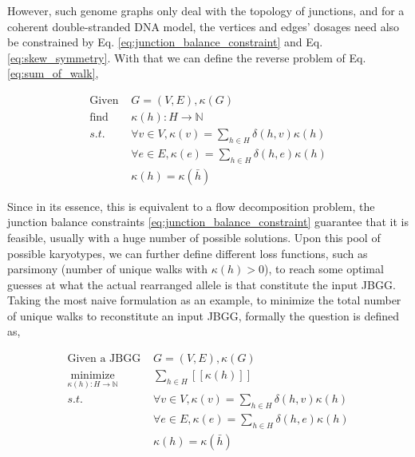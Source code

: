 \documentclass[phd,tocprelim]{cornell}
\begin{document}
However, such genome graphs only deal with the topology of junctions, and for a coherent double-stranded DNA model, the vertices and edges' dosages need also be constrained by Eq. \ref{eq:junction_balance_constraint} and Eq. \ref{eq:skew_symmetry}. With that we can define the reverse problem of Eq. \ref{eq:sum_of_walk},



\begin{equation} \label{eq:walk_decomposition}
    \begin{aligned}
        \text{Given } & G = (V, E), \kappa(G) \\
        \text{find } & \kappa(h):H \rightarrow \mathbb{N} \\
        s.t. & \forall v \in V, \kappa(v) = \sum_{h \in H}\delta(h,v)\kappa(h) \\
        & \forall e \in E, \kappa(e) = \sum_{h \in H}\delta(h,e)\kappa(h) \\
        & \kappa(h) = \kappa(\bar{h})
    \end{aligned}
\end{equation}

Since in its essence, this is equivalent to a flow decomposition problem, the junction balance constraints \ref{eq:junction_balance_constraint} guarantee that it is feasible, usually with a huge number of possible solutions. Upon this pool of possible karyotypes, we can further define different loss functions, such as parsimony (number of unique walks with $\kappa(h)>0$), to reach some optimal guesses at what the actual rearranged allele is that constitute the input JBGG. Taking the most naive formulation as an example, to minimize the total number of unique walks to reconstitute an input JBGG, formally the question is defined as,

\begin{equation} \label{eq:walk_decomposition_parsimony}
    \begin{aligned}
        \text{Given a JBGG } & G = (V, E), \kappa(G) \\
        \underset{\kappa(h):H \rightarrow \mathbb{N}}{\text{minimize}} & \sum_{h \in H} [\![ \kappa(h) ]\!] \\
        s.t. & \forall v \in V, \kappa(v) = \sum_{h \in H}\delta(h,v)\kappa(h) \\
        & \forall e \in E, \kappa(e) = \sum_{h \in H}\delta(h,e)\kappa(h) \\
        & \kappa(h) = \kappa(\bar{h})
    \end{aligned}
\end{equation}
\end{document}
